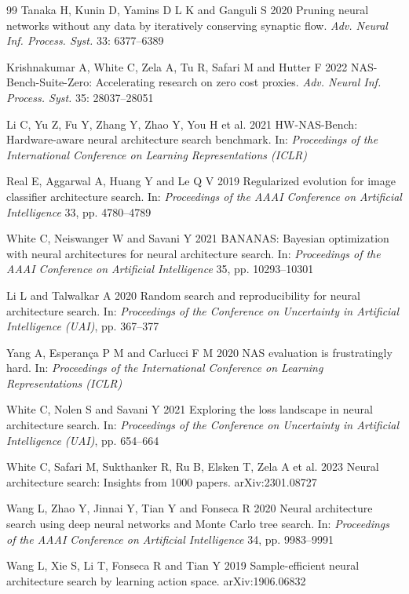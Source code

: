 \documentclass{sadhana}
\begin{document}
\begin{thebibliography}{99}
 Tanaka H, Kunin D, Yamins D L K and Ganguli S 2020 Pruning neural networks without any data by iteratively conserving synaptic flow. \textit{Adv. Neural Inf. Process. Syst.} 33: 6377--6389

 Krishnakumar A, White C, Zela A, Tu R, Safari M and Hutter F 2022 NAS-Bench-Suite-Zero: Accelerating research on zero cost proxies. \textit{Adv. Neural Inf. Process. Syst.} 35: 28037--28051

 Li C, Yu Z, Fu Y, Zhang Y, Zhao Y, You H et al. 2021 HW-NAS-Bench: Hardware-aware neural architecture search benchmark. In: \textit{Proceedings of the International Conference on Learning Representations (ICLR)}

 Real E, Aggarwal A, Huang Y and Le Q V 2019 Regularized evolution for image classifier architecture search. In: \textit{Proceedings of the AAAI Conference on Artificial Intelligence} 33, pp. 4780--4789

 White C, Neiswanger W and Savani Y 2021 BANANAS: Bayesian optimization with neural architectures for neural architecture search. In: \textit{Proceedings of the AAAI Conference on Artificial Intelligence} 35, pp. 10293--10301

 Li L and Talwalkar A 2020 Random search and reproducibility for neural architecture search. In: \textit{Proceedings of the Conference on Uncertainty in Artificial Intelligence (UAI)}, pp. 367--377

 Yang A, Esperan\c{c}a P M and Carlucci F M 2020 NAS evaluation is frustratingly hard. In: \textit{Proceedings of the International Conference on Learning Representations (ICLR)}

 White C, Nolen S and Savani Y 2021 Exploring the loss landscape in neural architecture search. In: \textit{Proceedings of the Conference on Uncertainty in Artificial Intelligence (UAI)}, pp. 654--664

 White C, Safari M, Sukthanker R, Ru B, Elsken T, Zela A et al. 2023 Neural architecture search: Insights from 1000 papers. arXiv:2301.08727

 Wang L, Zhao Y, Jinnai Y, Tian Y and Fonseca R 2020 Neural architecture search using deep neural networks and Monte Carlo tree search. In: \textit{Proceedings of the AAAI Conference on Artificial Intelligence} 34, pp. 9983--9991

 Wang L, Xie S, Li T, Fonseca R and Tian Y 2019 Sample-efficient neural architecture search by learning action space. arXiv:1906.06832


\end{thebibliography}
\end{document}
